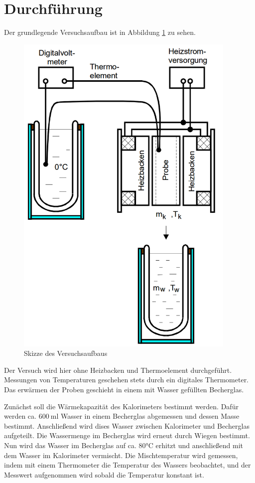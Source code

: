 \section{Durchführung}
\label{sec:Durchführung}
Der grundlegende Versuchsaufbau ist in Abbildung \ref{fig:aufbau} zu sehen.

\begin{figure}
  \centering
  \includegraphics[width=300pt]{data/aufbau.png}
  \caption{Skizze des Versuchsaufbaus \cite{Versuchsanleitung}}
  \label{fig:aufbau}
\end{figure}

Der Versuch wird hier ohne Heizbacken und Thermoelement durchgeführt. Messungen
von Temperaturen geschehen stets durch ein digitales Thermometer. Das erwärmen der
Proben geschieht in einem mit Wasser gefüllten Becherglas.

Zunächst soll die Wärmekapazität des Kalorimeters bestimmt werden. Dafür werden ca.
$\SI{600}{\milli\litre}$ Wasser in einem Becherglas abgemessen und dessen Masse bestimmt. Anschließend
wird dises Wasser zwischen Kalorimeter
und Becherglas aufgeteilt. Die Wassermenge im Becherglas wird erneut durch Wiegen
bestimmt. Nun wird das Wasser im Becherglas auf ca. 80°C erhitzt und anschließend
mit dem Wasser im Kalorimeter vermischt. Die Mischtemperatur wird gemessen, indem
mit einem Thermometer die Temperatur des Wassers beobachtet, und der Messwert aufgenommen
wird sobald die Temperatur konstant ist.

